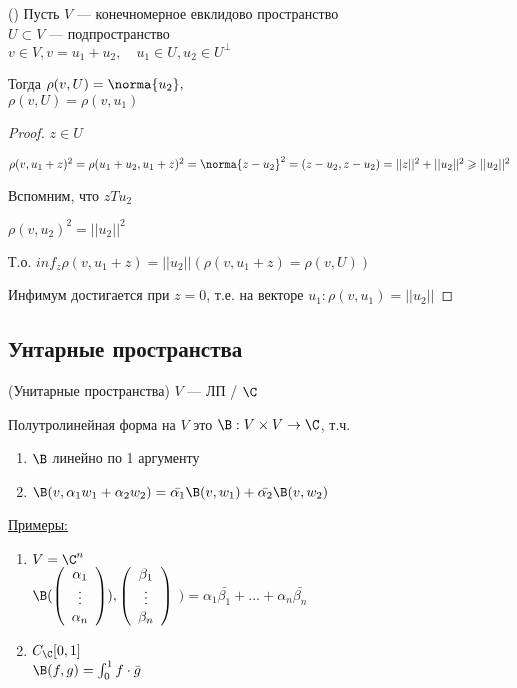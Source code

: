 \begin{theorem}()
    Пусть $V$ --- конечномерное евклидово пространство \\
    $U \subset V$ --- подпространство \\
    $v \in V, v = u_1 + u_2, \quad u_1 \in U, u_2 \in U^{\perp}$

    Тогда $\rho(v, U) = \norma{u_2},$ \\
    $\rho(v, U) = \rho(v, u_1)$

    \begin{proof}
    \emptyln
        $z \in U$

        $\rho(v, u_1 + z)^2 = \rho(u_1 + u_2, u_1 + z)^2 = \norma{z - u_2}^2 = (z - u_2, z - u_2) = ||z||^2 + ||u_2||^2 \geqslant ||u_2||^2$

        Вспомним, что $z T u_2$

        $\rho(v, u_2)^2 = ||u_2||^2$

        Т.о. $inf_z \rho(v, u_1 + z) = ||u_2|| (\rho(v, u_1 + z) = \rho(v, U))$

        Инфимум достигается при $z = 0$, т.е. на векторе $u_1: \rho(v, u_1) = ||u_2||$
    \end{proof}
\end{theorem}

\subsection*{Унтарные пространства}

\begin{conj}(Унитарные пространства)
    $V$ --- ЛП / $\C$
\end{conj}
\begin{conj}
    Полутролинейная форма на $V$ это 
    $\B: V \times V \to \C$, т.ч.
    \begin{enumerate}
        \item $\B$ линейно по 1 аргументу
        \item $\B(v, \alpha_1 w_1 + \alpha_2 w_2) = \bar{\alpha_1} \B(v, w_1) + \bar{\alpha_2}\B(v, w_2)$
    \end{enumerate}
    \underline{Примеры:}
    \begin{enumerate}
        \item $V = \C^n$ \\
        $\B(\left(\begin{array}{c}
        \alpha_1 \\ 
        \vdots \\ 
        \alpha_n
        \end{array}\right)), 
        \left(\begin{array}{c}
        \beta_1 \\ 
        \vdots \\ 
        \beta_n
        \end{array}\right)$
        $) = \alpha_1 \bar{\beta_1} + \dots + \alpha_n \bar{\beta_n}$
        \item $C_{\C} [0, 1]$ \\
        $\B(f, g) = \int_{0}^{1} f \cdot \bar{g}$
    \end{enumerate}    
\end{conj}

